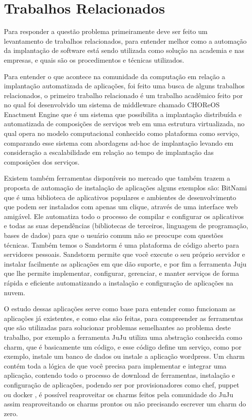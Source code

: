 \section{Trabalhos Relacionados}
\label{section:trabalhos_relacionados}
Para responder a questão problema primeiramente deve ser feito um levantamento
de trabalhos relacionados, para entender melhor como a automação da implantação
de software está sendo utilizada como solução na academia e nas empresas, e
quais são os procedimentos e técnicas utilizados.

Para entender o que acontece na comunidade da computação em relação a implantação
automatizada de aplicações, foi feito uma busca de alguns trabalhos relacionados, o primeiro
trabalho relacionado é um trabalho acadêmico feito por \cite{leo2014} no qual foi
desenvolvido um sistema de middleware chamado CHOReOS Enactment Engine que é um
sistema que possibilita a implantação distribuída e automatizada de composições
de serviços web em uma estrutura virtualizada, no qual opera no modelo
computacional conhecido como plataforma como serviço, comparando esse sistema
com abordagens ad-hoc de implantação levando em consideração a escalabilidade
em relação ao tempo de implantação das composições dos serviços.

Existem também ferramentas disponíveis no mercado que também trazem a proposta
de automação de instalação de aplicações alguns exemplos são: \cite{bitnami}
BitNami que é uma biblioteca de aplicativos populares e ambientes de
desenvolvimento que podem ser instalados com apenas um clique, através de uma interface web
amigável. Ele automatiza todo o
processo de compilar e configurar os aplicativos e todas as suas dependências
(bibliotecas de terceiros, linguagem de programação, bases de dados) para que o
usuário comum não se preocupe com questões técnicas. Também temos o \cite{sandstormio}
Sandstorm é uma plataforma de código aberto para servidores
pessoais. Sandstorm permite que você execute o seu próprio servidor e instalar
facilmente as aplicações em que dão suporte, e por fim a ferramenta \cite{juju}
Juju que lhe permite implementar, configurar, gerenciar, e manter serviços de forma
rápida e eficiente automatizando a instalação e configuração de aplicações na nuvem.

O estudo dessas aplicações serve como base para entender como funcionam as aplicações
já existentes, e como elas são feitas, para compreender as ferramentas que são
utilizadas para solucionar problemas semelhantes ao problema deste
trabalho, por exemplo a ferramenta JuJu utiliza uma abstração conhecida como charm,
que é basicamente um código, e esse código define um serviço, como por exemplo,
instale um banco de dados ou instale a aplicação wordpress. Um charm
contém toda a lógica de que você precisa para implementar e integrar uma aplicação,
contendo todo o processo de download de ferramentas, instalação e configuração de
aplicações, podendo ser por provisionadores como chef, puppet ou docker \cite{juju},
é possível reaproveitar os charms feitos pela comunidade do JuJu assim
reaproveitando os charms prontos ou não precisando escrever um charm do zero.

